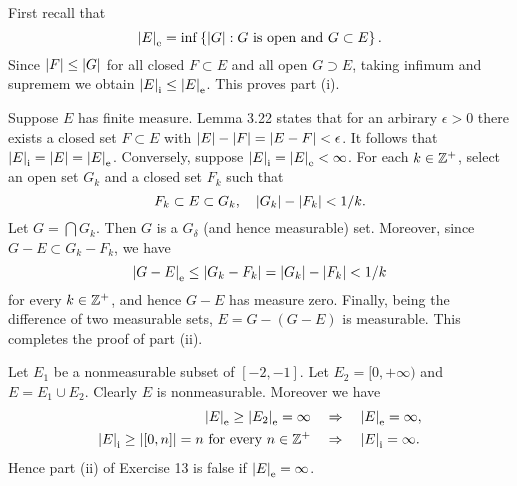 \begin{exercise}{3.13}
  First recall that
  \[
    \left\vert E\right\vert_\mathrm{e} = \inf \left\{ \left\vert G\right\vert : G \text{ is open and } G \subset E\right\}.
  \]
  Since $\left\vert F\right\vert \le \left\vert G\right\vert$ for all closed $F \subset E$
  and all open $G \supset E$,
  taking infimum and supremem we obtain
  $\left\vert E\right\vert_\mathrm{i} \le \left\vert E\right\vert_\mathrm{e}$.
  This proves part (i).

  Suppose $E$ has finite measure.
  Lemma 3.22 states that for an arbirary $\epsilon > 0$
  there exists a closed set $F \subset E$ with
  $\left\vert E\right\vert - \left\vert F\right\vert = \left\vert E-F\right\vert < \epsilon$.
  It follows that $\left\vert E\right\vert_\mathrm{i} = \left\vert E\right\vert = \left\vert E\right\vert_\mathrm{e}$.
  Conversely, suppose $\left\vert E\right\vert_\mathrm{i} = \left\vert E\right\vert_\mathrm{e} < \infty$.
  For each $k \in \mathbb{Z}^+$,
  select an open set $G_k$ and a closed set $F_k$ such that
  \[
    F_k \subset E \subset G_k, \quad \left\vert G_k\right\vert - \left\vert F_k\right\vert < 1/k.
  \]
  Let $G = \bigcap G_k$.
  Then $G$ is a $G_\delta$ (and hence measurable) set.
  Moreover, since $G - E \subset G_k - F_k$, we have
  \[
    \left\vert G-E\right\vert_\mathrm{e} \le \left\vert G_k - F_k\right\vert = \left\vert G_k\right\vert - \left\vert F_k\right\vert < 1/k
  \]
  for every $k \in \mathbb{Z}^+$,
  and hence $G-E$ has measure zero.
  Finally, being the difference of two measurable sets,
  $E = G - (G-E)$ is measurable.
  This completes the proof of part (ii).
\end{exercise}

\begin{exercise}{3.14}
  Let $E_1$ be a nonmeasurable subset of $[-2, -1]$.
  Let $E_2 = [0, +\infty)$ and $E = E_1 \cup E_2$.
  Clearly $E$ is nonmeasurable.
  Moreover we have
  \[
    \begin{aligned}
      \left\vert E\right\vert_\mathrm{e} \ge \left\vert E_2\right\vert_\mathrm{e} = \infty \quad &\Rightarrow \quad \left\vert E\right\vert_\mathrm{e} = \infty, \\
      \left\vert E\right\vert_\mathrm{i} \ge \left\vert[0, n]\right\vert = n \text{ for every } n \in \mathbb{Z}^+
      \quad &\Rightarrow \quad \left\vert E\right\vert_\mathrm{i} = \infty.
    \end{aligned}
  \]
  Hence part (ii) of Exercise 13 is false if $\left\vert E\right\vert_\mathrm{e} = \infty$.
\end{exercise}

